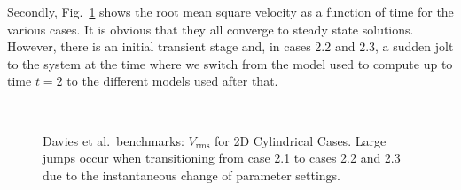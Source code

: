 \documentclass{article}
\begin{document}
Secondly, Fig.~\ref{fig:davies-2DcylinderVrms} shows the root mean square
velocity as a function of time for the various cases. It is obvious that they
all converge to steady state solutions. However, there is an initial transient
stage and, in cases 2.2 and 2.3, a sudden jolt to the system at the time where
we switch from the model used to compute up to time $t=2$ to the
different models used after that.

\begin{figure}[h]
  \hfill
  \\
  \hfill
  \hfill
  \caption{Davies et al.~benchmarks: $V_{\text{rms}}$ for 2D Cylindrical Cases. Large jumps occur when transitioning from case 2.1 to cases 2.2 and 2.3 due to the instantaneous change of parameter settings.}
  \label{fig:davies-2DcylinderVrms}
\end{figure}
\end{document}
